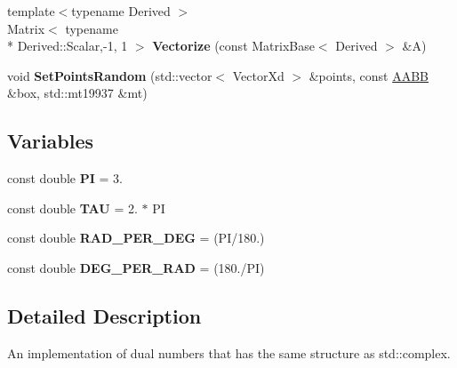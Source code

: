 \begin{DoxyCompactItemize}
\item 
\hypertarget{namespace_d_r_d_s_p_a9e0d9b1e83327e41a76366b4158f2813}{{\footnotesize template$<$typename Derived $>$ }\\Matrix$<$ typename \\*
Derived\-::\-Scalar,-\/1, 1 $>$ {\bfseries Vectorize} (const Matrix\-Base$<$ Derived $>$ \&A)}\label{namespace_d_r_d_s_p_a9e0d9b1e83327e41a76366b4158f2813}

\item 
\hypertarget{namespace_d_r_d_s_p_aed7e416be6e486d50e2fb2297f4e3cb7}{void {\bfseries Set\-Points\-Random} (std\-::vector$<$ Vector\-Xd $>$ \&points, const \hyperlink{struct_d_r_d_s_p_1_1_a_a_b_b}{A\-A\-B\-B} \&box, std\-::mt19937 \&mt)}\label{namespace_d_r_d_s_p_aed7e416be6e486d50e2fb2297f4e3cb7}

\end{DoxyCompactItemize}
\subsection*{Variables}
\begin{DoxyCompactItemize}
\item 
\hypertarget{namespace_d_r_d_s_p_ad47b07f4acdc0f3b71a95559987c7f76}{const double {\bfseries P\-I} = 3.}\label{namespace_d_r_d_s_p_ad47b07f4acdc0f3b71a95559987c7f76}

\item 
\hypertarget{namespace_d_r_d_s_p_a05798e4dca96bba71331b4c80d849e3d}{const double {\bfseries T\-A\-U} = 2. $\ast$ P\-I}\label{namespace_d_r_d_s_p_a05798e4dca96bba71331b4c80d849e3d}

\item 
\hypertarget{namespace_d_r_d_s_p_a11608cecd3ec1a439466b6c84e117d3f}{const double {\bfseries R\-A\-D\-\_\-\-P\-E\-R\-\_\-\-D\-E\-G} = (P\-I/180.)}\label{namespace_d_r_d_s_p_a11608cecd3ec1a439466b6c84e117d3f}

\item 
\hypertarget{namespace_d_r_d_s_p_a9879471b02473d4e18166800c39e9d59}{const double {\bfseries D\-E\-G\-\_\-\-P\-E\-R\-\_\-\-R\-A\-D} = (180./P\-I)}\label{namespace_d_r_d_s_p_a9879471b02473d4e18166800c39e9d59}

\end{DoxyCompactItemize}


\subsection{Detailed Description}
An implementation of dual numbers that has the same structure as std\-::complex. 